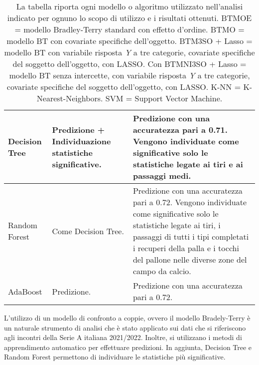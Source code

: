 \begin{table}[]
\begin{longtable}{|C{0.18\textwidth}|C{0.3\textwidth}|C{0.5\textwidth}|}
	\hline	
	Decision Tree & Predizione + Individuazione statistiche significative. & Predizione con una accuratezza pari a 0.71. Vengono individuate come significative solo le statistiche legate ai tiri e ai passaggi medi.\\
	\hline	
	Random Forest & Come Decision Tree. & Predizione con una accuratezza pari a 0.72. Vengono individuate come significative solo le statistiche legate ai tiri, i passaggi di tutti i tipi completati i recuperi della palla e i tocchi del pallone nelle diverse zone del campo da calcio. \\
	\hline	
	AdaBoost & Predizione. & Predizione con una accuratezza pari a 0.72. \\
	\hline
\end{longtable}	
\vspace*{5mm}

\caption{La tabella riporta ogni modello o algoritmo utilizzato nell'analisi indicato per ognuno lo scopo di utilizzo e i risultati ottenuti. BTMOE = modello Bradley-Terry standard con effetto d'ordine. BTMO = modello BT con covariate specifiche dell'oggetto. BTM3SO + Lasso = modello BT con variabile risposta \emph{Y} a tre categorie, covariate specifiche del soggetto dell'oggetto, con LASSO. Con BTMNI3SO + Lasso = modello BT senza intercette, con variabile risposta \emph{Y} a tre categorie, covariate specifiche del soggetto dell'oggetto, con LASSO. K-NN = K-Nearest-Neighbors. SVM = Support Vector Machine.} \label{tab:fine}
\end{table}
L'utilizzo di un modello di confronto a coppie, ovvero il modello Bradely-Terry è un naturale strumento di analisi che è stato applicato sui dati che si riferiscono agli incontri della Serie A italiana 2021/2022. 
Inoltre, si utilizzano i metodi di apprendimento automatico per effettuare predizioni. In aggiunta, Decision Tree e Random Forest permettono di individuare le statistiche più significative. \\

